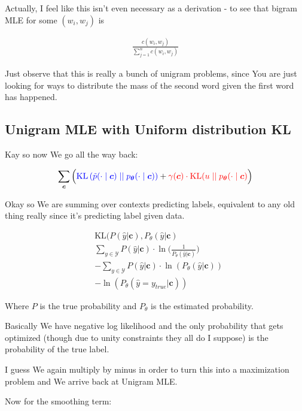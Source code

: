 \documentclass{article}
\newcommand{\KL}{\mathrm{KL}}
\newcommand{\uniform}{u}
\newcommand{\vtheta}{\boldsymbol{\theta}}
\newcommand{\model}{p_{\vtheta}}
\newcommand{\context}{\boldsymbol{c}}
\begin{document}
		Actually, I feel like this isn't even necessary as a derivation - to see that bigram MLE for some $(w_i, w_j)$ is
		
		\begin{align}
			\frac{c(w_i, w_j)}{\sum_{j=1}^n c(w_i, w_j)}
		\end{align}
		
		Just observe that this is really a bunch of unigram problems, since You are just looking for ways to distribute the mass of the second word given the first word has happened.
		
	\subsection{Unigram MLE with Uniform distribution KL}
	
		Kay so now We go all the way back:
		
		\begin{align}
	  	 \sum_{\context} \Big( {\color{blue} \KL\left(\tilde{p}(\cdot 			\mid \context) \mid\mid \model(\cdot \mid \context)					\right)} + {\color{red}\gamma(\context) \cdot 						\KL(\uniform \mid\mid \model(\cdot \mid \context)}\Big)
		\end{align}
		
		Okay so We are summing over contexts predicting labels, equivalent to any old thing really since it's predicting label given data.
		
		\begin{align}
			&\KL(P(\hat{y}|\context), P_\theta(\hat{y}|\context)\\
			&\sum_{y\in\mathcal{Y}} P(\hat{y}|\context )\cdot\ln\bigg(\frac{1}{P_\theta(\hat{y}|\context)} \bigg)\\
			& - \sum_{y\in\mathcal{Y}} P(\hat{y}|\context )\cdot\ln(P_\theta(\hat{y}|\context))\\
			& -\ln(P_\theta(\hat{y} = y_{true}|\context))
		\end{align}
		
		Where $P$ is the true probability and $P_\theta$ is the estimated probability.
		
		Basically We have negative log likelihood and the only probability that gets optimized (though due to unity constraints they all do I suppose) is the probability of the true label.
		
		I guess We again multiply by minus in order to turn this into a maximization problem and We arrive back at Unigram MLE.
		
		Now for the smoothing term:
		
\end{document}
